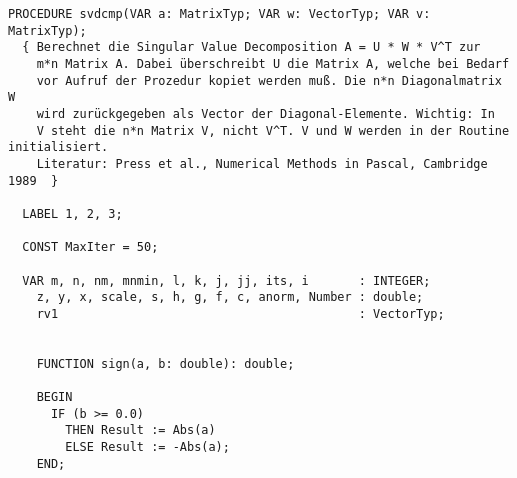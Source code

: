 \begin{lstlisting}[caption=Singular value decomposition]
  PROCEDURE svdcmp(VAR a: MatrixTyp; VAR w: VectorTyp; VAR v: MatrixTyp);
  { Berechnet die Singular Value Decomposition A = U * W * V^T zur
    m*n Matrix A. Dabei überschreibt U die Matrix A, welche bei Bedarf
    vor Aufruf der Prozedur kopiet werden muß. Die n*n Diagonalmatrix W
    wird zurückgegeben als Vector der Diagonal-Elemente. Wichtig: In
    V steht die n*n Matrix V, nicht V^T. V und W werden in der Routine initialisiert.
    Literatur: Press et al., Numerical Methods in Pascal, Cambridge 1989  }

  LABEL 1, 2, 3;

  CONST MaxIter = 50;

  VAR m, n, nm, mnmin, l, k, j, jj, its, i       : INTEGER;
    z, y, x, scale, s, h, g, f, c, anorm, Number : double;
    rv1                                          : VectorTyp;


    FUNCTION sign(a, b: double): double;

    BEGIN
      IF (b >= 0.0)
        THEN Result := Abs(a)
        ELSE Result := -Abs(a);
    END;


\end{lstlisting}

